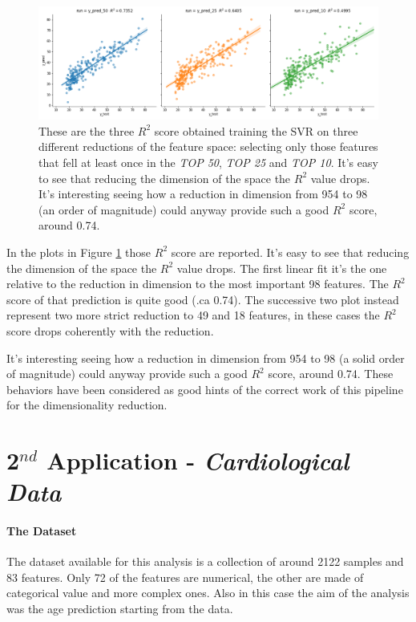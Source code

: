 \documentclass{article}
\begin{document}
\begin{figure}[ht]
	\includegraphics[width=\textwidth]{three_graphs}
	\caption{These are the three $R^2$ score obtained training the SVR on three different reductions of the feature space: selecting only those features that fell at least once in the \emph{TOP 50}, \emph{TOP 25} and \emph{TOP 10}. It's easy to see that reducing the dimension of the space the $R^2$ value drops. It's interesting seeing how a reduction in dimension from 954 to 98 (an order of magnitude) could anyway provide such a good $R^2$ score, around 0.74.}
	\label{fig:Brain_graphs}
	\centering
\end{figure}

In the plots in Figure \ref{fig:Brain_graphs} those $R^2$ score are reported. It's easy to see that reducing the dimension of the space the $R^2$ value drops. The first linear fit it's the one relative to the reduction in dimension to the most important 98 features. The $R^2$ score of that prediction is quite good (.ca 0.74). The successive two plot instead represent two more strict reduction to 49 and 18 features, in these cases the $R^2$ score drops coherently with the reduction.

It's interesting seeing how a reduction in dimension from 954 to 98 (a solid order of magnitude) could anyway provide such a good $R^2$ score, around 0.74. These behaviors have been considered as good hints of the correct work of this pipeline for the dimensionality reduction.

\section*{2$^{nd}$ Application - \emph{Cardiological Data}}

\paragraph{The Dataset} The dataset available for this analysis is a collection of around 2122 samples and 83 features. Only 72 of the features are numerical, the other are made of categorical value and more complex ones. Also in this case the aim of the analysis was the age prediction starting from the data.
\end{document}
